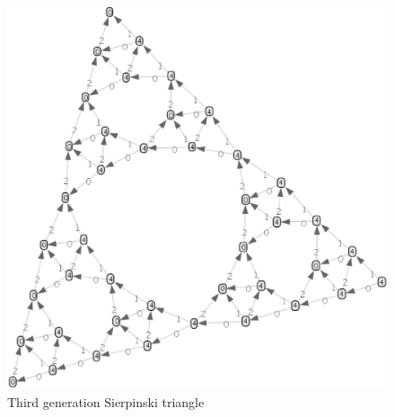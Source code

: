 \begin{figure}[htb]
 \begin{center}
  \includegraphics[scale=.4,angle=-15]{sierpinski-3.eps}
 \end{center}
\vspace*{-2.5cm}
\caption{Third generation Sierpinski triangle \label{fig:sierpinski}}
\end{figure}


